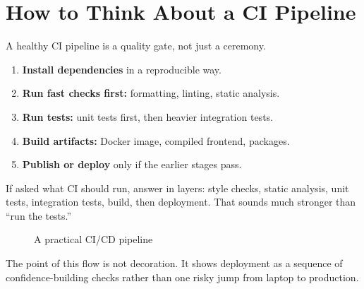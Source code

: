 \documentclass[12pt, a4paper, oneside]{book}
\begin{document}
\section{How to Think About a CI Pipeline}

A healthy CI pipeline is a quality gate, not just a ceremony.

\begin{enumerate}[leftmargin=2em]
    \item \textbf{Install dependencies} in a reproducible way.
    \item \textbf{Run fast checks first:} formatting, linting, static analysis.
    \item \textbf{Run tests:} unit tests first, then heavier integration tests.
    \item \textbf{Build artifacts:} Docker image, compiled frontend, packages.
    \item \textbf{Publish or deploy} only if the earlier stages pass.
\end{enumerate}

\begin{examtipbox}
If asked what CI should run, answer in layers: style checks, static analysis, unit tests, integration tests, build, then deployment. That sounds much stronger than ``run the tests.''
\end{examtipbox}

\begin{figure}[H]
\centering
{}
\caption{A practical CI/CD pipeline}
\label{fig:cicd-flow}
\end{figure}

The point of this flow is not decoration. It shows deployment as a sequence of confidence-building checks rather than one risky jump from laptop to production.
\end{document}
